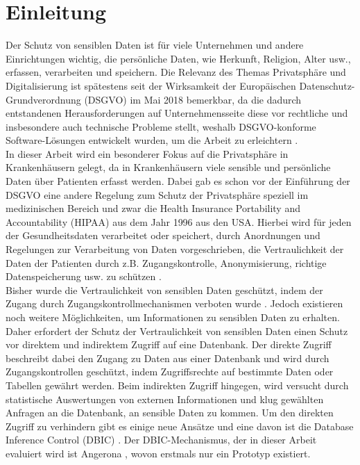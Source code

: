 \documentclass[german,version-2020-11]{uzl-thesis}
\begin{document}
\chapter{Einleitung}
Der Schutz von sensiblen Daten ist für viele Unternehmen und andere Einrichtungen wichtig, die persönliche Daten, wie Herkunft, Religion, Alter usw., erfassen, verarbeiten und speichern. Die Relevanz des Themas Privatsphäre und Digitalisierung ist spätestens seit der Wirksamkeit der Europäischen Datenschutz-Grundverordnung (DSGVO) \cite{1} im  Mai 2018 bemerkbar, da die dadurch entstandenen Herausforderungen auf Unternehmensseite diese vor rechtliche und insbesondere auch technische Probleme stellt, weshalb DSGVO-konforme Software-Lösungen entwickelt wurden, um die Arbeit zu erleichtern \cite{9}.\\ 
In dieser Arbeit wird ein besonderer Fokus auf die Privatsphäre in Krankenhäusern gelegt, da in Krankenhäusern viele sensible und persönliche Daten über Patienten erfasst werden. Dabei gab es schon vor der Einführung der DSGVO eine andere Regelung zum Schutz der Privatsphäre speziell im medizinischen Bereich und zwar die Health Insurance Portability and Accountability (HIPAA) aus dem Jahr 1996 aus den USA. Hierbei wird für jeden der Gesundheitsdaten verarbeitet oder speichert, durch Anordnungen und Regelungen zur Verarbeitung von Daten vorgeschrieben, die Vertraulichkeit der Daten der Patienten durch z.B. Zugangskontrolle, Anonymisierung, richtige Datenspeicherung usw. zu schützen \cite{7}.\\
Bisher wurde die Vertraulichkeit von sensiblen Daten geschützt, indem der Zugang durch Zugangskontrollmechanismen verboten wurde \cite{2}. Jedoch existieren noch weitere Möglichkeiten, um Informationen zu sensiblen Daten zu erhalten. Daher erfordert der Schutz der Vertraulichkeit von sensiblen Daten einen Schutz vor direktem und indirektem Zugriff auf eine Datenbank. Der direkte Zugriff beschreibt dabei den Zugang zu Daten aus einer Datenbank und wird durch Zugangskontrollen geschützt, indem Zugriffsrechte auf bestimmte Daten oder Tabellen gewährt werden. Beim indirekten Zugriff hingegen, wird versucht durch statistische Auswertungen von externen Informationen und klug gewählten Anfragen an die Datenbank, an sensible Daten zu kommen. Um den direkten Zugriff zu verhindern gibt es einige neue Ansätze und eine davon ist die Database Inference Control (DBIC) \cite{25}. Der DBIC-Mechanismus, der in dieser Arbeit evaluiert wird ist Angerona \cite{guarnieri2017securing}, wovon erstmals nur ein Prototyp existiert. \\ 
\end{document}
